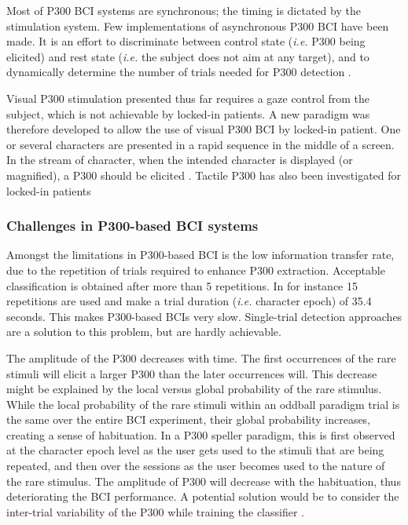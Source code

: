 Most of P300 BCI systems are synchronous; the timing is dictated by the stimulation system. 
Few implementations of asynchronous P300 BCI have been made. 
It is an effort to discriminate between control state (\textit{i.e.} P300 being elicited) and rest state (\textit{i.e.} the subject does not aim at any target), and to dynamically determine the number of trials needed for P300 detection \citep{lenhardt_adaptive_2008, zhang_asynchronous_2008, schettini_self-calibration_2014}.%

Visual P300 stimulation presented thus far requires a gaze control from the subject, which is not achievable by locked-in patients.
A new paradigm was therefore developed to allow the use of visual P300 BCI by locked-in patient. 
One or several characters are presented in a rapid sequence in the middle of a screen. 
In the stream of character, when the intended character is displayed (or magnified), a P300 should be elicited \citep{acqualagna_novel_2010, treder_gaze-independent_2011, aloise_covert_2012,  acqualagna_gaze-independent_2013}. 
Tactile P300 has also been investigated for locked-in patients \citep{kaufmann_comparison_2013}  

\subsubsection{Challenges in P300-based BCI systems}
\label{p300-challenges}

Amongst the limitations in P300-based BCI is the low information transfer rate, due to the repetition of trials required to enhance P300 extraction. 
Acceptable classification is obtained after more than 5 repetitions. 
In \citep{rakotomamonjy_ensemble_2005} for instance 15 repetitions are used and make a trial duration (\textit{i.e.} character epoch) of 35.4 seconds. 
This makes P300-based BCIs very slow. 
Single-trial detection approaches are a solution to this problem, but are hardly achievable. 

\par
The amplitude of the P300 decreases with time. 
The first occurrences of the rare stimuli will elicit a larger P300 \citep{courchesne_stimulus_1975} than the later occurrences will. 
This decrease might be explained by the local versus global probability of the rare stimulus. 
While the local probability of the rare stimuli within an oddball paradigm trial is the same over the entire BCI experiment, their global probability increases, creating a sense of habituation.
In a P300 speller paradigm, this is first observed at the character epoch level as the user gets used to the stimuli that are being repeated, and then over the sessions as the user becomes used to the nature of the rare stimulus. 
The amplitude of P300 will decrease with the habituation, thus deteriorating the BCI performance. 
A potential solution would be to consider the inter-trial variability of the P300 while training the classifier \citep{rakotomamonjy_ensemble_2005}.

